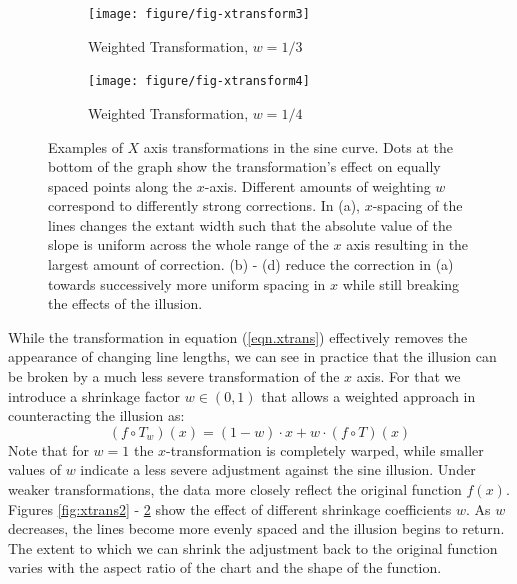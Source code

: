 \documentclass[12pt]{article}\usepackage[]{graphicx}\usepackage[]{color}
\begin{document}
\begin{figure}[h!tbp]
\begin{subfigure}[b]{.45\linewidth}\centering 
\texttt{[image: figure/fig-xtransform3]}
\caption[Weighted transformation]{Weighted Transformation, $w=1/3$}
\label{fig:xtrans3}
\end{subfigure} \hfill
\begin{subfigure}[b]{.45\linewidth}\centering
\texttt{[image: figure/fig-xtransform4]}
\caption[Weighted transformation]{Weighted Transformation, $w=1/4$}
\label{fig:xtrans4}
\end{subfigure}
\caption[X axis transformations]{Examples of $X$ axis transformations in the sine curve.  Dots at the bottom of the graph show the transformation's effect on equally spaced points along the $x$-axis. Different amounts of weighting $w$ correspond to differently strong corrections. In (a),   $x$-spacing of the lines changes the extant width such that the absolute value of the slope is uniform across the whole range of the $x$ axis resulting in the largest amount of correction.  (b) - (d) reduce the correction in (a) towards successively more uniform spacing in $x$ while still breaking the effects of the illusion.}
\label{fig:xtrans}
\end{figure}
While the transformation in equation (\ref{eqn.xtrans}) effectively removes the appearance of changing line lengths, we can see in practice that the illusion can be broken by a much less severe transformation of the $x$ axis. 
For that we introduce a shrinkage factor $w \in (0,1)$ that allows a weighted approach in counteracting the illusion as: 
%
\begin{equation}\label{eqn.xtrans.weighted}
(f \circ T_w)(x) = (1-w) \cdot x + w \cdot (f \circ T)(x)
\end{equation}
%
Note that for $w=1$ the $x$-transformation is completely warped, while smaller values of $w$ indicate a less severe adjustment against the sine illusion.  Under  weaker transformations, the data more closely reflect the original function $f(x)$. Figures \ref{fig:xtrans2} - \ref{fig:xtrans4} show the effect of different shrinkage coefficients $w$. As $w$ decreases, the lines become more evenly spaced and the illusion begins to return. The extent  to which we can shrink the adjustment back to the original function  varies with the aspect ratio of the chart and the shape of the function. 
\end{document}

